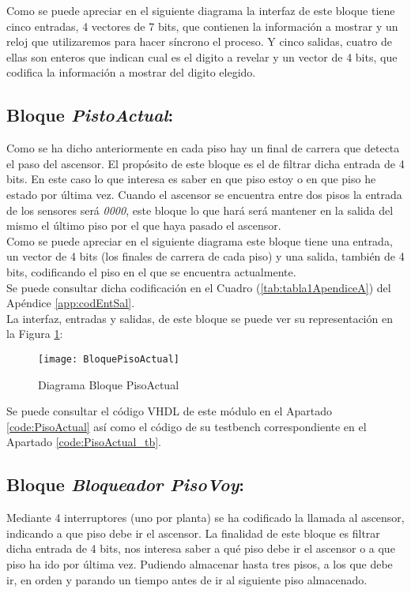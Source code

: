 	Como se puede apreciar en el siguiente diagrama la interfaz de este bloque tiene cinco entradas, 4 vectores de 7 bits, que contienen la información a mostrar  y un reloj que utilizaremos para hacer síncrono el proceso. Y cinco salidas, cuatro de ellas son enteros que indican cual es el digito a revelar y un vector de 4 bits, que codifica la información a mostrar del digito elegido.

\subsection{Bloque \textit{PistoActual}:} \label{bloque:PisoActual}
    Como se ha dicho anteriormente en cada piso hay un final de carrera que detecta el paso del ascensor. El propósito de este bloque es el de filtrar dicha entrada de 4 bits. En este caso lo que interesa es saber en que piso estoy o en que piso he estado por última vez. Cuando el ascensor se encuentra entre dos pisos la entrada de los sensores será \textit{0000}, este bloque lo que hará será mantener en la salida del mismo el último piso por el que haya pasado el ascensor. \\ 
    
    Como se puede apreciar en el siguiente diagrama este bloque tiene una entrada, un vector de 4 bits (los finales de carrera de cada piso) y una salida, también de 4 bits, codificando el piso en el que se encuentra actualmente. \\ 
    
    Se puede consultar dicha codificación en el Cuadro (\ref{tab:tabla1ApendiceA}) del Apéndice \ref{app:codEntSal}. \\ 
    
    La interfaz, entradas y salidas, de este bloque se puede ver su representación en la Figura \ref{fig:BloquePisoActual}:
    
    \begin{figure}[H]
		    \centering
		    \hspace*{-1.8cm}
		    \texttt{[image: BloquePisoActual]}
		    \caption{Diagrama Bloque PisoActual}
		    \label{fig:BloquePisoActual}
	\end{figure}
	
	Se puede consultar el código VHDL de este módulo en el Apartado \ref{code:PisoActual} así como el código de su testbench correspondiente en el Apartado \ref{code:PisoActual_tb}.\\ 

\subsection{Bloque \textit{Bloqueador PisoVoy}:}
    Mediante 4 interruptores (uno por planta) se ha codificado la llamada al ascensor, indicando a que piso debe ir el ascensor. La finalidad de este bloque es filtrar dicha entrada de 4 bits, nos interesa saber a qué piso debe ir el ascensor o a que piso ha ido por última vez. Pudiendo almacenar hasta tres pisos, a los que debe ir, en orden y parando un tiempo antes de ir al siguiente piso almacenado. \\
    
